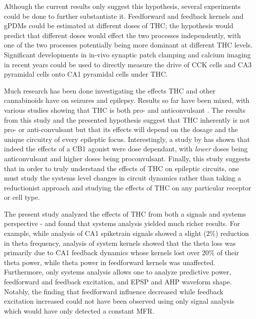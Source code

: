 \documentclass[11pt,a4paper,final]{article}
\begin{document}
Although the current results only suggest this hypothesis, several experiments could be done to further substantiate it.
Feedforward and feedback kernels and gPDMs could be estimated at different doses of THC; the hypothesis would predict that different doses would effect the two processes independently, with one of the two processes potentially being more dominant at different THC levels.
Significant developments in in-vivo synaptic patch clamping \citep{tao15} and calcium imaging in recent years could be used to directly measure the drive of CCK cells and CA3 pyramidal cells onto CA1 pyramidal cells under THC.

Much research has been done investigating the effects THC and other cannabinoids have on seizures and epilepsy.
Results so far have been mixed, with various studies showing that THC is both pro- and anticonvulsant \citep{wallace01,blair06,deshpande07,rudenko12,katona15,hill13,katona15}.
The results from this study and the presented hypothesis suggest that THC inherently is not pro- or anti-convulsant but that its effects will depend on the dosage and the unique circuitry of every epileptic focus.
Interestingly, a study by \citet{rudenko12} has shown that indeed the effects of a CB1 agonist were dose dependant, with \textit{lower} doses being anticonvulsant and higher doses being proconvulsant.
Finally, this study suggests that in order to truly understand the effects of THC on epileptic circuits, one must study the systems level changes in circuit dynamics rather than taking a reductionist approach and studying the effects of THC on any particular receptor or cell type.

The present study analyzed the effects of THC from both a signals and systems perspective - and found that systems analysis yielded much richer results.
For example, while analysis of CA1 spiketrain signals showed a slight (2\%) reduction in theta frequency, analysis of system kernels showed that the theta loss was primarily due to CA1 feedback dynamics whose kernels lost over 20\% of their theta power, while theta power in feedforward kernels was unaffected.
Furthermore, only systems analysis allows one to analyze predictive power, feedforward and feedback excitation, and EPSP and AHP waveform shape. Notably, the finding that feedforward influence decreased while feedback excitation increased could not have been observed using only signal analysis which would have only detected a constant MFR.
\end{document}
